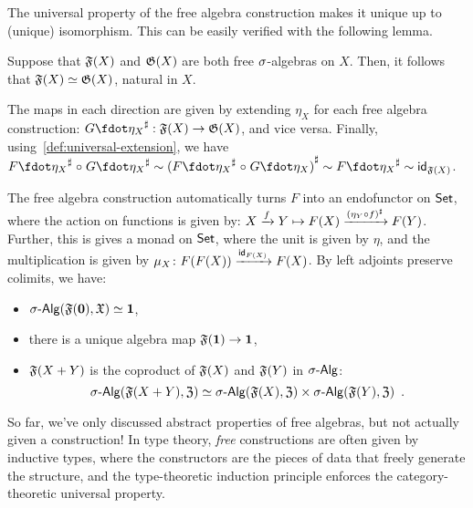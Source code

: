 The universal property of the free algebra construction makes it unique up to (unique) isomorphism.
%
This can be easily verified with the following lemma.
\begin{lemma}
    \label{lem:free-algebras-unique}
    Suppose that $\mathfrak{F}(X)$ and $\mathfrak{G}(X)$ are both free $\sigma$-algebras on $X$.
    Then, it follows that $\mathfrak{F}(X) \mathrel{\simeq} \mathfrak{G}(X)$, natural in $X$.
\end{lemma}
\begin{proofsketch}
    The maps in each direction are given by extending $\eta_X$ for each free algebra construction:
    $\ext{G\fdot\eta_{X}} : \str{F}(X) \to \str{G}(X)$, and vice versa.
    Finally, using~\cref{def:universal-extension}, we have
    \(
    \ext{F\fdot\eta_{X}} \comp \ext{G\fdot\eta_{X}} \htpy
    \ext{(\ext{F\fdot\eta_{X}} \comp G\fdot\eta_{X})} \htpy
    \ext{F\fdot\eta_{X}} \htpy
    \idfunc_{\str{F}(X)}
    \).
\end{proofsketch}
The free algebra construction automatically turns $F$ into an endofunctor on $\mathsf{Set}$,
where the action on functions is given by:
$X \xrightarrow{f} Y \mapsto F(X) \xrightarrow{{(\eta_{Y} \mathrel{\circ} f)}^{\sharp}} F(Y)$.
%
Further, this is gives a monad on $\mathsf{Set}$, where the unit is given by $\eta$,
and the multiplication is given by $\mu_{X}\colon F(F(X)) \xrightarrow{\operatorname{\mathsf{id}}_{F(X)}} F(X)$.
%
By left adjoints preserve colimits, we have:
\begin{proposition}
    \label{prop:free-algebra-colimits}
    \leavevmode
    \begin{itemize}
        \item $\sigAlg(\str{F}(\emptyt), \str{X}) \eqv \unitt$, 
        \item there is a unique algebra map $\mathfrak{F}({\mathbf{1}}) \to {\mathbf{1}}$,
        \item $\mathfrak{F}(X + Y)$ is the coproduct of $\mathfrak{F}(X)$ and $\mathfrak{F}(Y)$ in $\sigAlg$:
              \[
                  \sigAlg(\str{F}(X + Y), \str{Z}) \eqv
                  \sigAlg(\str{F}(X), \str{Z}) \times \sigAlg(\str{F}(Y), \str{Z})
                  \enspace.
              \]
    \end{itemize}
\end{proposition}

So far, we've only discussed abstract properties of free algebras, but not actually given a construction!
%
In type theory, \emph{free} constructions are often given by inductive types,
where the constructors are the pieces of data that freely generate the structure,
and the type-theoretic induction principle enforces the category-theoretic universal property.

